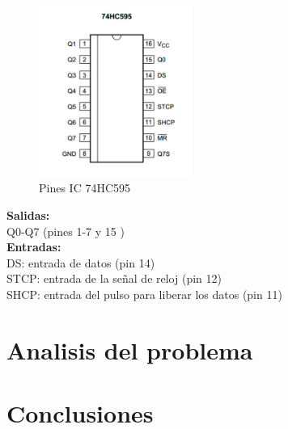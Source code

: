 \documentclass{article}
\begin{document}
\begin{figure}[!ht]
\includegraphics[width=5cm]{74HC595.jpg}
\centering
\caption{Pines IC 74HC595}
\end{figure}

\noindent\textbf{Salidas:}\\ 
\indent Q0-Q7 (pines 1-7 y 15 )\\
\textbf{Entradas:}\\
\indent DS: entrada de datos (pin 14)\\
\indent STCP: entrada de la señal de reloj (pin 12)\\
\indent SHCP: entrada del pulso para liberar los datos (pin 11)


\section{Analisis del problema} \label{analisis}



\section{Conclusiones} \label{conclusiones}




\end{document}
